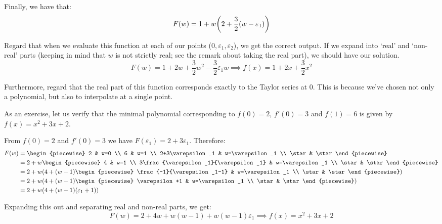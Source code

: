 \begin{example}
    Finally, we have that:
    $$
        F(w) = 1+w\paren*{2+\frac{3}{2}(w-\varepsilon_1)}
    $$

    Regard that when we evaluate this function at each of our points ($0,\varepsilon_1,\varepsilon_2$), we get the correct output. If we expand into `real' and `non-real' parts (keeping in mind that $w$ is not strictly real; see the remark about taking the real part), we should have our solution.
    $$
        F(w) = 1+2w+\frac{3}{2}w^2-\frac{3}{2}\varepsilon_1w \implies f(x)=1+2x+\frac{3}{2}x^2
    $$

    Furthermore, regard that the real part of this function corresponds exactly to the Taylor series at $0$. This is because we've chosen not only a polynomial, but also to interpolate at a single point.
\end{example}

\begin{example}
    As an exercise, let us verify that the minimal polynomial corresponding to $f(0)=2$, $f'(0)=3$ and $f(1)=6$ is given by $f(x)=x^2+3x+2$.

    From $f(0)=2$ and $f'(0)=3$ we have $F(\varepsilon_1)=2+3\varepsilon_1$. Therefore:
    \begin{align*}
        F(w) &= \begin{piecewise}
            2 & w=0 \\
            6 & w=1 \\
            2+3\varepsilon_1 & w=\varepsilon_1 \\
            \star & \star
        \end{piecewise} \\
        &= 2+w\begin{piecewise}
            4 & w=1 \\
            3\frac{\varepsilon_1}{\varepsilon_1} & w=\varepsilon_1 \\
            \star & \star
        \end{piecewise} \\
        &= 2+w\paren*{4+(w-1)\begin{piecewise}
            \frac{-1}{\varepsilon_1-1} & w=\varepsilon_1 \\
            \star & \star
        \end{piecewise}} \\
        &= 2+w\paren*{4+(w-1)\begin{piecewise}
            \varepsilon+1 & w=\varepsilon_1 \\
            \star & \star
        \end{piecewise}} \\
        &= 2+w\paren*{4+(w-1)(\varepsilon_1+1)}
    \end{align*}

    Expanding this out and separating real and non-real parts, we get:
    $$
        F(w)=2+4w+w(w-1)+w(w-1)\varepsilon_1 \implies f(x)=x^2+3x+2
    $$
\end{example}

